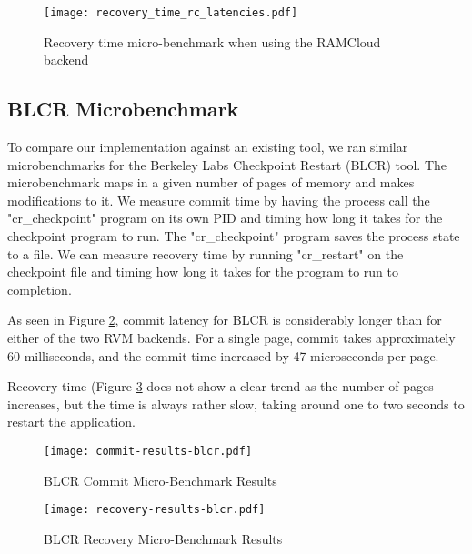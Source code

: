 \begin{figure}[t!]
\begin{center}
\texttt{[image: recovery\_time\_rc\_latencies.pdf]}
\end{center}
\caption{Recovery time micro-benchmark when using the RAMCloud backend}
\label{fig:rc-recovery-ubm}
\end{figure}

\subsection{BLCR Microbenchmark}

To compare our implementation against an existing tool, we ran similar
microbenchmarks for the Berkeley Labs Checkpoint Restart (BLCR) tool.
The microbenchmark maps in a given number of pages of memory and makes
modifications to it. We measure commit time by having the process call the
"cr\_checkpoint" program on its own PID and timing how long it takes for the
checkpoint program to run. The "cr\_checkpoint" program saves the process state
to a file. We can measure recovery time by running "cr\_restart" on the
checkpoint file and timing how long it takes for the program to run to completion.

As seen in Figure \ref{fig:blcr-commit-ubm}, commit latency for BLCR is
considerably longer than for either of the two RVM backends. For a single page,
commit takes approximately 60 milliseconds, and the commit time increased by
47 microseconds per page.

Recovery time (Figure \ref{fig:blcr-recovery-ubm} does not show a clear trend
as the number of pages increases, but the time is always rather slow, taking
around one to two seconds to restart the application.

\begin{figure}[t!]
    \caption{BLCR Commit Micro-Benchmark Results}
    \texttt{[image: commit-results-blcr.pdf]}
    \label{fig:blcr-commit-ubm}
\end{figure}

\begin{figure}[t!]
    \caption{BLCR Recovery Micro-Benchmark Results}
    \texttt{[image: recovery-results-blcr.pdf]}
    \label{fig:blcr-recovery-ubm}
\end{figure}
